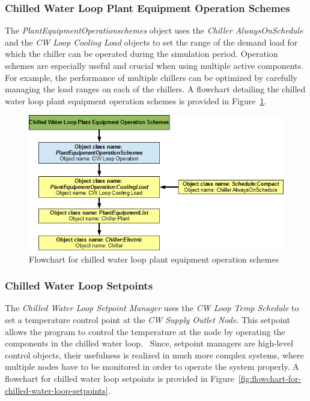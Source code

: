 \subsubsection{Chilled Water Loop Plant Equipment Operation Schemes}\label{chilled-water-loop-plant-equipment-operation-schemes}

The \emph{PlantEquipmentOperationschemes} object uses the \emph{Chiller AlwaysOnSchedule} and the \emph{CW Loop Cooling Load} objects to set the range of the demand load for which the chiller can be operated during the simulation period. Operation schemes are especially useful and crucial when using multiple active components. For example, the performance of multiple chillers can be optimized by carefully managing the load ranges on each of the chillers. A flowchart detailing the chilled water loop plant equipment operation schemes is provided in Figure~\ref{fig:flowchart-for-chilled-water-loop-plant-equipment}.

\begin{figure}[htbp]
\centering
\includegraphics{media/image025.png}
\caption{Flowchart for chilled water loop plant equipment operation schemes \protect \label{fig:flowchart-for-chilled-water-loop-plant-equipment}}
\end{figure}

\subsubsection{Chilled Water Loop Setpoints}\label{chilled-water-loop-setpoints}

The \emph{Chilled Water Loop Setpoint Manager} uses the \emph{CW Loop Temp Schedule} to set a temperature control point at the \emph{CW Supply Outlet Node}. This setpoint allows the program to control the temperature at the node by operating the components in the chilled water loop. ~Since, setpoint managers are high-level control objects, their usefulness is realized in much more complex systems, where multiple nodes have to be monitored in order to operate the system properly. A flowchart for chilled water loop setpoints is provided in Figure~\ref{fig:flowchart-for-chilled-water-loop-setpoints}.

